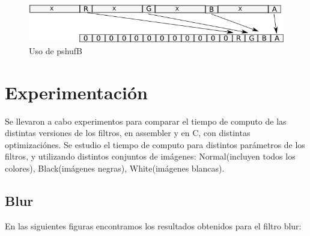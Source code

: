 \documentclass[a4paper]{article}
\begin{document}
\begin{figure}[H]
\centering
\includegraphics[scale=0.8]{imagenes/shufle.png}
\caption{Uso de pshufB}
\label{lshValue}
\end{figure}



\section{Experimentación}

Se llevaron a cabo experimentos para comparar el tiempo de computo de las distintas versiones de los filtros, en assembler y en C, con distintas optimizaciónes. Se estudio el tiempo de computo para distintos parámetros de los filtros, y utilizando distintos conjuntos de imágenes: Normal(incluyen todos los colores), Black(imágenes negras), White(imágenes blancas).


\subsection{Blur}

En las siguientes figuras encontramos los resultados obtenidos para el filtro blur:
\end{document}
